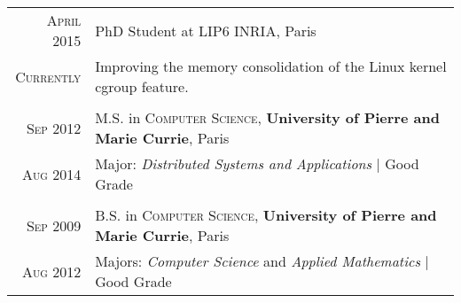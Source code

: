 \documentclass[a4paper,10pt]{article} %
\begin{document}
\begin{tabular}{rl}


\textsc{April 2015} & PhD Student at \textsc{LIP6 INRIA}, Paris\\
\textsc{Currently} & \footnotesize{
						Improving the memory consolidation of the Linux kernel cgroup feature.
					}\\
\multicolumn{2}{c}{} \\


\textsc{Sep 2012} & M.S. in \textsc{Computer Science}, \textbf{University of Pierre and Marie Currie}, Paris\\
\textsc{Aug 2014} & Major: \emph{Distributed Systems and Applications} | Good Grade\\
&\\


\textsc{Sep 2009} & B.S. in \textsc{Computer Science}, \textbf{University of Pierre and Marie Currie}, Paris \\
\textsc{Aug 2012} & Majors: \emph{Computer Science} and \emph{Applied Mathematics} | Good Grade\\






\end{tabular}

\end{document}

